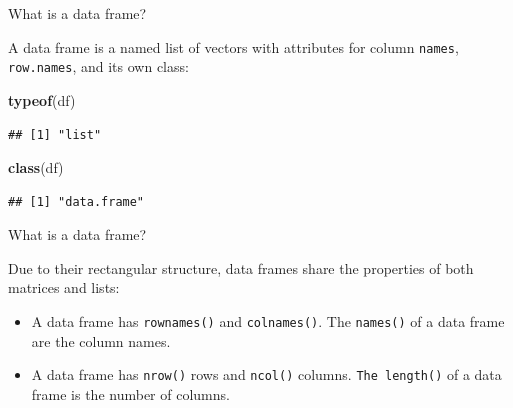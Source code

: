 \documentclass[ignorenonframetext,]{beamer}
\newenvironment{Shaded}{\begin{snugshade}}{\end{snugshade}}
\newcommand{\KeywordTok}[1]{\textcolor[rgb]{0.13,0.29,0.53}{\textbf{#1}}}
\newcommand{\NormalTok}[1]{#1}
\begin{document}
\begin{frame}[fragile]{What is a data frame?}
\protect\hypertarget{what-is-a-data-frame-2}{}

A data frame is a named list of vectors with attributes for column
\texttt{names}, \texttt{row.names}, and its own class:

\begin{Shaded}
\begin{Highlighting}[]
\KeywordTok{typeof}\NormalTok{(df) }
\end{Highlighting}
\end{Shaded}

\begin{verbatim}
## [1] "list"
\end{verbatim}

\begin{Shaded}
\begin{Highlighting}[]
\KeywordTok{class}\NormalTok{(df) }
\end{Highlighting}
\end{Shaded}

\begin{verbatim}
## [1] "data.frame"
\end{verbatim}

\end{frame}

\begin{frame}[fragile]{What is a data frame?}
\protect\hypertarget{what-is-a-data-frame-3}{}

Due to their rectangular structure, data frames share the properties of
both matrices and lists:

\begin{itemize}
\item
  A data frame has \texttt{rownames()} and \texttt{colnames()}. The
  \texttt{names()} of a data frame are the column names.
\item
  A data frame has \texttt{nrow()} rows and \texttt{ncol()} columns.
  \texttt{The\ length()} of a data frame is the number of columns.
\end{itemize}

\end{frame}
\end{document}
